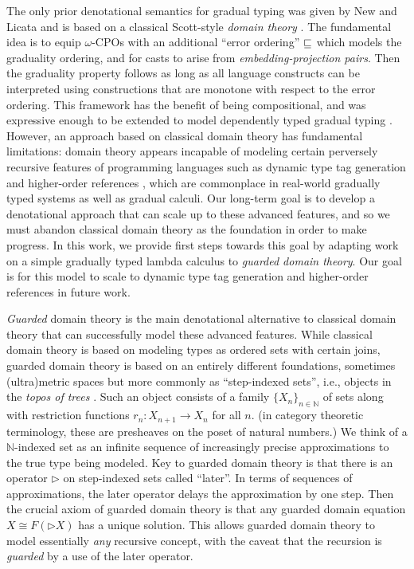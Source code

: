 The only prior denotational semantics for gradual typing was given by
New and Licata and is based on a classical Scott-style \emph{domain
theory} \cite{new-licata18}. The fundamental idea is to equip
$\omega$-CPOs with an additional ``error ordering'' $\sqsubseteq$ which
models the graduality ordering, and for casts to arise from
\emph{embedding-projection pairs}. Then the graduality property
follows as long as all language constructs can be interpreted using
constructions that are monotone with respect to the error ordering.
%
This framework has the benefit of being compositional, and was
expressive enough to be extended to model dependently typed gradual
typing \cite{gradualizing-cic}.
%
However, an approach based on classical domain theory has fundamental
limitations: domain theory appears incapable of modeling certain perversely
recursive features of programming languages such as dynamic type tag
generation and higher-order references \cite{Birkedal-Stovring-Thamsborg-2009}, which are commonplace in
real-world gradually typed systems as well as gradual calculi.
%
Our long-term goal is to develop a denotational approach that can
scale up to these advanced features, and so we must abandon classical
domain theory as the foundation in order to make progress. In this
work, we provide first steps towards this goal by adapting work on a
simple gradually typed lambda calculus to \emph{guarded domain
theory}. Our goal is for this model to scale to dynamic type tag
generation and higher-order references in future work.

\emph{Guarded} domain theory is the main denotational alternative to
classical domain theory that can successfully model these advanced
features. While classical domain theory is based on modeling types as
ordered sets with certain joins, guarded domain theory is based on an
entirely different foundations, sometimes (ultra)metric spaces but
more commonly as ``step-indexed sets'', i.e., objects in the
\emph{topos of trees}
\cite{birkedal-mogelberg-schwinghammer-stovring2011}.  Such an object
consists of a family $\{X_n\}_{n \in \mathbb{N}}$ of sets along with
restriction functions $r_n : X_{n+1} \to X_n$ for all $n$.  (in
category theoretic terminology, these are presheaves on the poset of
natural numbers.)  We think of a $\mathbb{N}$-indexed set as an
infinite sequence of increasingly precise approximations to the true
type being modeled.
%
Key to guarded domain theory is that there is an operator
$\triangleright$ on step-indexed sets called ``later''. In terms of
sequences of approximations, the later operator delays the
approximation by one step. Then the crucial axiom of guarded domain
theory is that any guarded domain equation $X \cong F(\triangleright
X)$ has a unique solution. This allows guarded domain theory to model
essentially \emph{any} recursive concept, with the caveat that the
recursion is \emph{guarded} by a use of the later operator.

